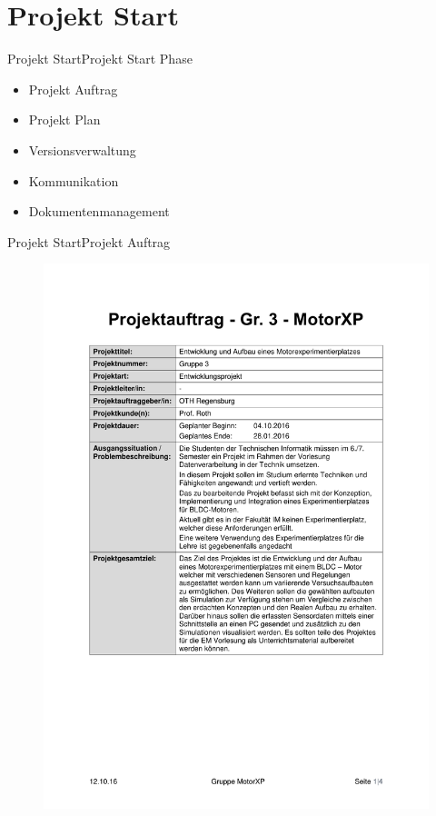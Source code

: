 \section{Projekt Start}
\begin{frame}{Projekt Start}{Projekt Start Phase}
  \begin{itemize}
    \item Projekt Auftrag
    \item Projekt Plan
    \item Versionsverwaltung
    \item Kommunikation
    \item Dokumentenmanagement
  \end{itemize}
\end{frame}

\begin{frame}{Projekt Start}{Projekt Auftrag}
\begin{figure} [htbp]
 \centering
 \includegraphics[scale=0.3]{../projectdefinition/Appendix/Projektauftrag_Gruppe3_MotorXP.pdf}
\end{figure}
 \end{frame}
